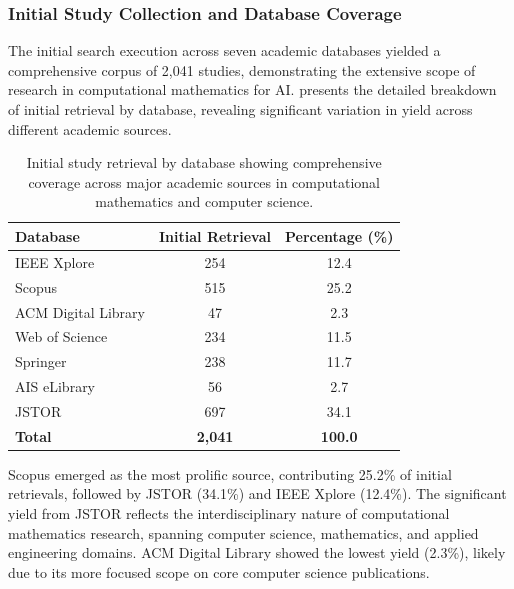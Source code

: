 \documentclass[acmsmall]{acmart}
\begin{document}
\subsubsection{Initial Study Collection and Database Coverage}\label{subsubsec:phase-2-literature-search-and-study-selection:initial-study-collection-and-database-coverage}

The initial search execution across seven academic databases yielded a comprehensive corpus of 2,041 studies, demonstrating the extensive scope of research in computational mathematics for AI.  presents the detailed breakdown of initial retrieval by database, revealing significant variation in yield across different academic sources.

\begin{table}[!htb]
    \centering
    \begingroup
    \setlength{\tabcolsep}{12pt}
    \renewcommand{\arraystretch}{1.4}
    \begin{tabular}{lcc}
        \toprule
        \textbf{Database} & \textbf{Initial Retrieval} & \textbf{Percentage (\%)} \\
        \midrule
        IEEE Xplore & 254 & 12.4 \\
        Scopus & 515 & 25.2 \\
        ACM Digital Library & 47 & 2.3 \\
        Web of Science & 234 & 11.5 \\
        Springer & 238 & 11.7 \\
        AIS eLibrary & 56 & 2.7 \\
        JSTOR & 697 & 34.1 \\
        \midrule
        \textbf{Total} & \textbf{2,041} & \textbf{100.0} \\
        \bottomrule
    \end{tabular}
    \endgroup
    \caption{Initial study retrieval by database showing comprehensive coverage across major academic sources in computational mathematics and computer science.}
    \label{tab:database_coverage}
\end{table}

Scopus emerged as the most prolific source, contributing 25.2\% of initial retrievals, followed by JSTOR (34.1\%) and IEEE Xplore (12.4\%). The significant yield from JSTOR reflects the interdisciplinary nature of computational mathematics research, spanning computer science, mathematics, and applied engineering domains. ACM Digital Library showed the lowest yield (2.3\%), likely due to its more focused scope on core computer science publications.
\end{document}
